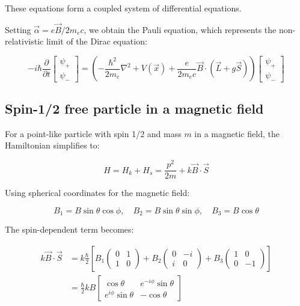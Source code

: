 \documentclass[italian]{HKNdocument}
\begin{document}
These equations form a coupled system of differential equations.

Setting $\vec{\alpha}=e \vec{B} / 2 m_{e} c$, we obtain the Pauli equation, which represents the non-relativistic limit of the Dirac equation:

\[
-i \hbar \frac{\partial}{\partial t}\left[\begin{array}{l}
\psi_{+}  \label{eq:11.26}\\
\psi_{-}
\end{array}\right]=\left(-\frac{\hbar^{2}}{2 m_{e}} \nabla^{2}+V(\vec{x})+\frac{e}{2 m_{e} c} \vec{B} \cdot(\vec{L}+g \vec{S})\right)\left[\begin{array}{l}
\psi_{+} \\
\psi_{-}
\end{array}\right]
\]

\subsection{Spin-1/2 free particle in a magnetic field}
For a point-like particle with spin 1/2 and mass $m$ in a magnetic field, the Hamiltonian simplifies to:

\begin{equation}
H=H_{k}+H_{s}=\frac{p^{2}}{2 m}+k \vec{B} \cdot \vec{S} \label{eq:11.27}
\end{equation}

Using spherical coordinates for the magnetic field:

\begin{equation}
B_{1}=B \sin \theta \cos \phi, \quad B_{2}=B \sin \theta \sin \phi, \quad B_{3}=B \cos \theta \label{eq:11.28}
\end{equation}

The spin-dependent term becomes:

\begin{align}
k \vec{B} \cdot \vec{S} &= k \frac{\hbar}{2}\left[B_{1}\left(\begin{array}{ll}
0 & 1 \\
1 & 0
\end{array}\right)+B_{2}\left(\begin{array}{cc}
0 & -i \\
i & 0
\end{array}\right)+B_{3}\left(\begin{array}{cc}
1 & 0 \\
0 & -1
\end{array}\right)\right] \\
&= \frac{\hbar}{2} k B\left[\begin{array}{cc}
\cos \theta & e^{-i \phi} \sin \theta \\
e^{i \phi} \sin \theta & -\cos \theta
\end{array}\right] \label{eq:11.29}
\end{align}
\end{document}
